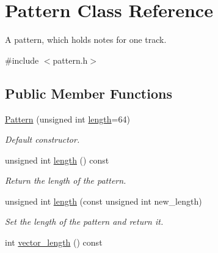 \hypertarget{class_pattern}{}\section{Pattern Class Reference}
\label{class_pattern}


A pattern, which holds notes for one track.  




{\ttfamily \#include $<$pattern.\+h$>$}

\subsection*{Public Member Functions}
\begin{DoxyCompactItemize}
\item 
\hyperlink{class_pattern_afd3d1d98b25659474df2be957f46d736}{Pattern} (unsigned int \hyperlink{class_pattern_a118a30585315cc29e801b6a37832c26f}{length}=64)\hypertarget{class_pattern_afd3d1d98b25659474df2be957f46d736}{}\label{class_pattern_afd3d1d98b25659474df2be957f46d736}

\begin{DoxyCompactList}\small\item\em Default constructor. \end{DoxyCompactList}\item 
unsigned int \hyperlink{class_pattern_a118a30585315cc29e801b6a37832c26f}{length} () const \hypertarget{class_pattern_a118a30585315cc29e801b6a37832c26f}{}\label{class_pattern_a118a30585315cc29e801b6a37832c26f}

\begin{DoxyCompactList}\small\item\em Return the length of the pattern. \end{DoxyCompactList}\item 
unsigned int \hyperlink{class_pattern_a1d30ffecfb7399e795b9f5484bd62c98}{length} (const unsigned int new\+\_\+length)\hypertarget{class_pattern_a1d30ffecfb7399e795b9f5484bd62c98}{}\label{class_pattern_a1d30ffecfb7399e795b9f5484bd62c98}

\begin{DoxyCompactList}\small\item\em Set the length of the pattern and return it. \end{DoxyCompactList}\item 
int \hyperlink{class_pattern_a2379d1a0732988e5df08e7156d7b8a58}{vector\+\_\+length} () const \hypertarget{class_pattern_a2379d1a0732988e5df08e7156d7b8a58}{}\label{class_pattern_a2379d1a0732988e5df08e7156d7b8a58}


\end{DoxyCompactItemize}
